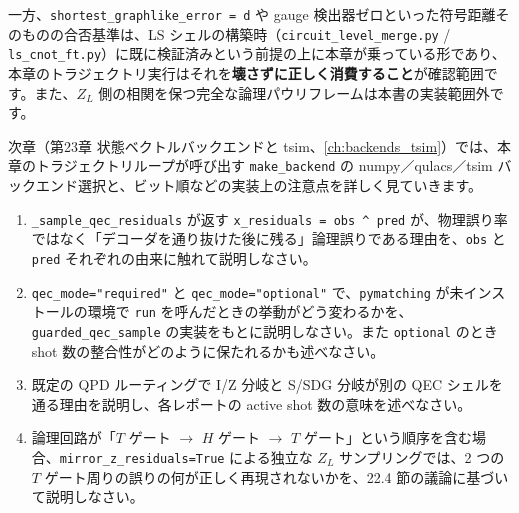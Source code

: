 一方、\texttt{shortest\_graphlike\_error = d} や gauge 検出器ゼロといった符号距離そのものの合否基準は、LS シェルの構築時（\texttt{circuit\_level\_merge.py} / \texttt{ls\_cnot\_ft.py}）に既に検証済みという前提の上に本章が乗っている形であり、本章のトラジェクトリ実行はそれを\textbf{壊さずに正しく消費すること}が確認範囲です。また、$Z_L$ 側の相関を保つ完全な論理パウリフレームは本書の実装範囲外です。

次章（第23章 状態ベクトルバックエンドと tsim、\ref{ch:backends_tsim}）では、本章のトラジェクトリループが呼び出す \texttt{make\_backend} の numpy／qulacs／tsim バックエンド選択と、ビット順などの実装上の注意点を詳しく見ていきます。

\begin{exercise}
  \begin{enumerate}
    \item \texttt{\_sample\_qec\_residuals} が返す \texttt{x\_residuals = obs \^{} pred} が、物理誤り率ではなく「デコーダを通り抜けた後に残る」論理誤りである理由を、\texttt{obs} と \texttt{pred} それぞれの由来に触れて説明しなさい。
    \item \texttt{qec\_mode="required"} と \texttt{qec\_mode="optional"} で、\texttt{pymatching} が未インストールの環境で \texttt{run} を呼んだときの挙動がどう変わるかを、\texttt{guarded\_qec\_sample} の実装をもとに説明しなさい。また \texttt{optional} のとき shot 数の整合性がどのように保たれるかも述べなさい。
    \item 既定の QPD ルーティングで I/Z 分岐と S/SDG 分岐が別の QEC シェルを通る理由を説明し、各レポートの active shot 数の意味を述べなさい。
    \item 論理回路が「$T$ ゲート $\to$ $H$ ゲート $\to$ $T$ ゲート」という順序を含む場合、\texttt{mirror\_z\_residuals=True} による独立な $Z_L$ サンプリングでは、2 つの $T$ ゲート周りの誤りの何が正しく再現されないかを、22.4 節の議論に基づいて説明しなさい。
  \end{enumerate}
\end{exercise}
